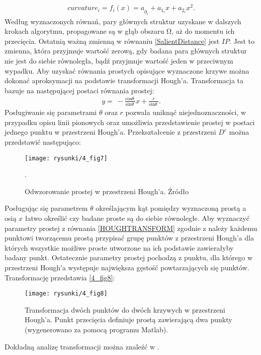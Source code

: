 \documentclass[12pt, twoside, openany]{report}
\theoremstyle{definition}
\begin{document}
\begin{align}
curvature_i={f_i\left(x\right)=a}_{0_i}+a_{1_i}x+a_{2_i}x^2.
\end{align}
Według wyznaczonych równań, pary głównych struktur uzyskane w dalszych krokach algorytmu, propagowane są w głąb obszaru $\mathrm{\Omega }$, aż do momentu ich przecięcia. Ostatnią ważną zmienną w równaniu \eqref{SalientDistance} jest $IP$. Jest to zmienna, która przyjmuje wartość zerową, gdy badana para głównych struktur nie jest do siebie równoległa, bądź przyjmuje wartość jeden w przeciwnym wypadku. Aby uzyskać równania prostych opisujące wyznaczone krzywe można dokonać aproksymacji na podstawie transformacji Hough'a. Transformacja ta bazuje na następującej postaci równania prostej:
\begin{align}
y=\ -\frac{{\mathrm{cos} \theta \ }}{{\mathrm{sin} \theta \ }}x+\frac{r}{{\mathrm{sin} \theta \ }}.
\label{HOUGHTRANSFORM}
\end{align}
Posługiwanie się parametrami $\theta $ oraz $r$ pozwala uniknąć niejednoznaczności, w przypadku opisu linii pionowych oraz umożliwia przedstawienie prostej w postaci jednego punktu w przestrzeni Hough'a. Przekształcenie z przestrzeni $D^c$ można przedstawić następująco:
\begin{figure}[!h]
	\centering
	\texttt{[image: rysunki/4\_fig7]}
	\caption{Odwzorowanie prostej w przestrzeni Hough’a. Źródło \cite{houghTransform}}.
\label{4_fig7}
\end{figure}
Posługując się parametrem $\theta$ określającym kąt pomiędzy wyznaczoną prostą a osią $x$ łatwo określić czy badane proste są do siebie równoległe. Aby wyznaczyć parametry prostej z równania \eqref{HOUGHTRANSFORM} zgodnie z \cite{houghTransform} należy każdemu punktowi tworzącemu prostą przypisać grupę punktów z przestrzeni Hough'a dla których wszystkie możliwe proste utworzone na ich podstawie zawierałyby badany punkt. Ostatecznie parametry prostej pochodzą z punktu, dla którego w przestrzeni Hough'a występuje największa gęstość powtarzających się punktów. Transformację przedstawia \autoref{4_fig8}:
\begin{figure}[!h]
	\centering
	\texttt{[image: rysunki/4\_fig8]}
	\caption{Transformacja dwóch punktów do dwóch krzywych w przestrzeni Hough'a. Punkt przecięcia definiuje prostą zawierającą dwa punkty (wygenerowano za pomocą programu Matlab).}
\label{4_fig8}
\end{figure}
Dokładną analizę transformacji można znaleźć w \cite{houghTransform}.
\end{document}
